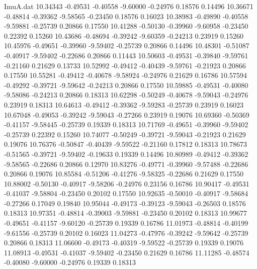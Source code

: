\begin{filecontents}{ImuA.dat}
  10.34343   -0.49531   -0.40558   -9.60000   -0.24976    0.18576    0.14496
  10.36671   -0.48814   -0.39362   -9.58565   -0.23450    0.18576    0.16023
  10.38983   -0.49890   -0.40558   -9.59881   -0.25739    0.20866    0.17550
  10.41288   -0.50130   -0.39960   -9.60958   -0.23450    0.22392    0.15260
  10.43686   -0.48694   -0.39242   -9.60359   -0.24213    0.23919    0.15260
  10.45976   -0.49651   -0.39960   -9.59402   -0.25739    0.20866    0.14496
  10.48301   -0.51087   -0.40917   -9.59402   -0.22686    0.20866    0.11443
  10.50603   -0.49531   -0.39840   -9.59761   -0.21160    0.21629    0.13733
  10.52992   -0.49412   -0.40439   -9.59761   -0.21923    0.20866    0.17550
  10.55281   -0.49412   -0.40678   -9.58924   -0.24976    0.21629    0.16786
  10.57594   -0.49292   -0.39721   -9.59642   -0.24213    0.20866    0.17550
  10.59885   -0.49531   -0.40080   -9.58086   -0.24213    0.20866    0.18313
  10.62298   -0.50249   -0.40678   -9.59043   -0.24976    0.23919    0.18313
  10.64613   -0.49412   -0.39362   -9.59283   -0.25739    0.23919    0.16023
  10.67048   -0.49053   -0.39242   -9.59043   -0.27266    0.23919    0.19076
  10.69360   -0.50369   -0.41157   -9.58445   -0.25739    0.19339    0.18313
  10.71769   -0.49651   -0.39960   -9.59402   -0.25739    0.22392    0.15260
  10.74077   -0.50249   -0.39721   -9.59043   -0.21923    0.21629    0.19076
  10.76376   -0.50847   -0.40439   -9.59522   -0.21160    0.17812    0.18313
  10.78673   -0.51565   -0.39721   -9.59402   -0.19633    0.19339    0.14496
  10.80989   -0.49412   -0.39362   -9.58565   -0.22686    0.20866    0.12970
  10.83276   -0.49771   -0.39960   -9.57488   -0.22686    0.20866    0.19076
  10.85584   -0.51206   -0.41276   -9.58325   -0.22686    0.21629    0.17550
  10.88002   -0.50130   -0.40917   -9.58206   -0.24976    0.23156    0.16786
  10.90417   -0.49531   -0.41037   -9.58804   -0.23450    0.20102    0.17550
  10.92635   -0.50010   -0.40917   -9.58684   -0.27266    0.17049    0.19840
  10.95044   -0.49173   -0.39123   -9.59043   -0.26503    0.18576    0.18313
  10.97351   -0.48814   -0.39003   -9.59881   -0.23450    0.20102    0.18313
  10.99677   -0.49651   -0.41157   -9.60120   -0.25739    0.19339    0.16786
  11.01973   -0.48814   -0.40199   -9.61556   -0.25739    0.20102    0.16023
  11.04273   -0.47976   -0.39242   -9.59642   -0.25739    0.20866    0.18313
  11.06600   -0.49173   -0.40319   -9.59522   -0.25739    0.19339    0.19076
  11.08913   -0.49531   -0.41037   -9.59402   -0.23450    0.21629    0.16786
  11.11285   -0.48574   -0.40080   -9.60000   -0.24976    0.19339    0.18313

\end{filecontents}
